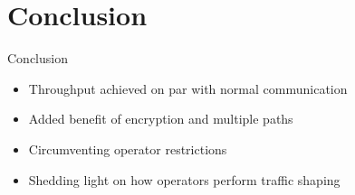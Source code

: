 \documentclass{beamer}
\begin{document}
\section{Conclusion}
\begin{frame}{Conclusion}
	\begin{itemize}
	\item Throughput achieved on par with normal communication
	\item Added benefit of encryption and multiple paths
	\item Circumventing operator restrictions
	\item Shedding light on how operators perform traffic shaping
	\end{itemize}
\end{frame}
\end{document}
